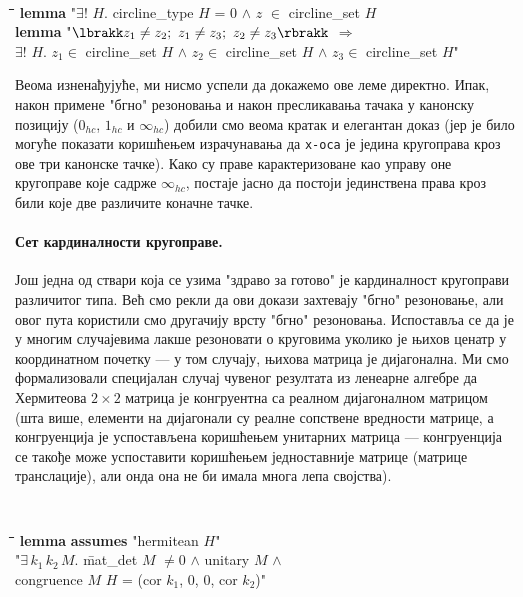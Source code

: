 {\tt
\begin{tabbing}
\hspace{5mm}\=\hspace{5mm}\=\hspace{5mm}\=\hspace{5mm}\=\hspace{5mm}\=\kill
{\bf lemma} "$\exists !$ $H$. circline\_type $H$ = 0 $\wedge$ $z$ $\in$ circline\_set $H$\\
{\bf lemma} "$\lbrakk z_1 \neq z_2;\ z_1 \neq z_3;\ z_2 \neq z_3\rbrakk$ $\Longrightarrow$ \\
\>$\exists !$ $H$. $z_1 \in $ circline\_set $H$ $\wedge$ $z_2 \in$ circline\_set $H$ $\wedge$ $z_3 \in$ circline\_set $H$"
\end{tabbing}
}

\noindent Веома изненађујуће, ми нисмо успели да докажемо ове леме
директно. Ипак, након примене "бгно" резоновања и након пресликавања
тачака у канонску позицију ($0_{hc}$, $1_{hc}$ и $\infty_{hc}$) добили
смо веома кратак и елегантан доказ (јер је било могуће показати
коришћењем израчунавања да {\tt x-оса} је једина кругоправа кроз ове
три канонске тачке). Како су праве карактеризоване као управу оне
кругоправе које садрже $\infty_{hc}$, постаје јасно да постоји
јединствена права кроз били које две различите коначне тачке.

\paragraph{Сет кардиналности кругоправе.}
Још једна од ствари која се узима "здраво за готово" је кардиналност
кругоправи различитог типа. Већ смо рекли да ови докази захтевају
"бгно" резоновање, али овог пута користили смо другачију врсту "бгно"
резоновања. Испоставља се да је у многим случајевима лакше резоновати
о круговима уколико је њихов ценатр у координатном почетку --- у том
случају, њихова матрица је дијагонална.  Ми смо формализовали
специјалан случај чувеног резултата из ленеарне алгебре да Хермитеова
$2\times2$ матрица је конгруентна са реалном дијагоналном матрицом
(шта више, елементи на дијагонали су реалне сопствене вредности
матрице, а конгруенција је успостављена коришћењем унитарних матрица
--- конгруенција се такође може успоставити коришћењем једноставније
матрице (матрице транслације), али онда она не би имала многа лепа
својства).

{\tt
\begin{tabbing}
\hspace{5mm}\=\hspace{5mm}\=\hspace{5mm}\=\hspace{5mm}\=\hspace{5mm}\=\kill
{\bf lemma} {\bf assumes} "hermitean $H$"\\
 "$\exists\,k_1\,k_2\,M$. \=mat\_det $M$ $\neq 0$ $\wedge$ unitary $M$ $\wedge$\\
\>\>congruence $M$ $H$ = (cor $k_1$, 0, 0, cor $k_2$)"
\end{tabbing}
}

